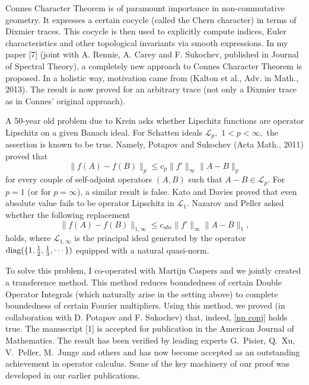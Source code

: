 \documentclass[12pt]{article}
\begin{document}
Connes Character Theorem is of paramount importance in non-commutative geometry. It expresses a certain cocycle (called the Chern character) in terms of Dixmier traces. This cocycle is then used to explicitly compute indices, Euler characteristics and other topological invariants via smooth expressions. In my paper [7] (joint with A. Rennie, A. Carey and F. Sukochev, published in Journal of Spectral Theory), a completely new approach to Connes Character Theorem is proposed. In a holistic way, motivation came from (Kalton et al., Adv. in Math., 2013). The result is now proved for an arbitrary trace (not only a Dixmier trace as in Connes' original approach). 

A 50-year old problem due to Krein asks whether Lipschitz functions are operator Lipschitz on a given Banach ideal. For Schatten ideals $\mathcal{L}_p,$ $1<p<\infty,$ the assertion is known to be true. Namely, Potapov and Sukochev (Acta Math., 2011) proved that
$$\|f(A)-f(B)\|_p\leq c_p\|f'\|_{\infty}\|A-B\|_p$$
for every couple of self-adjoint operators $(A,B)$ such that $A-B\in\mathcal{L}_p.$ For $p=1$ (or for $p=\infty$), a similar result is false. Kato and Davies proved that even absolute value fails to be operator Lipschitz in $\mathcal{L}_1.$ Nazarov and Peller asked whether the following replacement
\begin{equation}\label{np conj}
\|f(A)-f(B)\|_{1,\infty}\leq c_{abs}\|f'\|_{\infty}\|A-B\|_1,
\end{equation}
holds, where $\mathcal{L}_{1,\infty}$ is the principal ideal generated by the operator ${\rm diag}(\{1,\frac12,\frac13,\cdots\})$ equipped with a natural quasi-norm. 

To solve this problem, I co-operated with Martijn Caspers and we jointly created a transference method. This method reduces boundedness of certain Double Operator Integrals (which naturally arise in the setting above) to complete boundedness of certain Fourier multipliers. Using this method, we proved (in collaboration with D. Potapov and F. Sukochev) that, indeed, \eqref{np conj} holds true. The manuscript [1] is accepted for publication in the American Journal of Mathematics. The result has been verified by leading experts G.~Pisier, Q.~Xu, V.~Peller, M.~Junge and others and has now become accepted as an outstanding achievement in operator calculus. Some of the key machinery of our proof was developed in our earlier publications.
\end{document}
